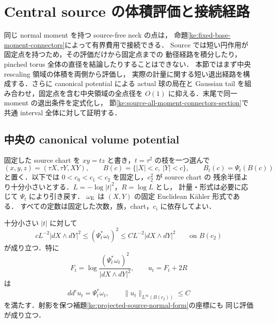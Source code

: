 \section{Central source の体積評価と接続経路}
\label{ke:source-connectors-section}

同じ normal moment を持つ source-free neck の点は，
命題\ref{ke:fixed-base-moment-connectors}によって有界費用で接続できる．
Source では短い円作用が固定点を持つため，その評価だけから固定点までの
動径経路を積分したり，pinched torus 全体の直径を結論したりすることはできない．
本節ではまず中央 rescaling 領域の体積を両側から評価し，
実際の計量に関する短い退出経路を構成する．さらに canonical potential による
actual 球の局在と Gaussian tail を組み合わせ，固定点を含む中央領域の全点径を
$O(1)$ に抑える．末尾で同一 moment の退出条件を定式化し，
節\ref{ke:source-all-moment-connectors-section}で共通 interval 全体に対して証明する．

\subsection{中央の canonical volume potential}

固定した source chart を $xy=tz$ と書き，$t=\tau^2$ の枝を一つ選んで
\[
 (x,y,z)=(\tau X,\tau Y,XY),\qquad
 B(c)=\{|X|<c,\ |Y|<c\},\qquad B_t(c)=\Psi_t(B(c))
\]
と置く．以下では $0<c_0<c_1<c_2$ を固定し，$c_2^2$ が source chart の
残余半径より十分小さいとする．$L=-\log|t|^2$，$R=\log L$ とし，
計量・形式は必要に応じて $\Psi_t$ により引き戻す．
$\omega_{\rm E}$ は $(X,Y)$ の固定 Euclidean K\"ahler 形式である．
すべての定数は固定した次数，族，chart，$c_i$ に依存してよい．

\begin{proposition}
\label{ke:source-central-density}
十分小さい $|t|$ に対して
\begin{equation}\label{ke:eq:source-central-density}
 cL^{-2}|dX\wedge dY|^2
 \le (\Psi_t^*\omega_t)^2
 \le CL^{-2}|dX\wedge dY|^2
 \qquad\text{on }B(c_2)
\end{equation}
が成り立つ．特に
\[
 F_t=\log\frac{(\Psi_t^*\omega_t)^2}{|dX\wedge dY|^2},
 \qquad u_t=F_t+2R
\]
は
\begin{equation}\label{ke:eq:source-central-potential}
 dd^c u_t=\Psi_t^*\omega_t,
 \qquad \|u_t\|_{L^\infty(B(c_2))}\le C
\end{equation}
を満たす．射影を保つ補題\ref{ke:projected-source-normal-form}の座標にも
同じ評価が成り立つ．
\end{proposition}

